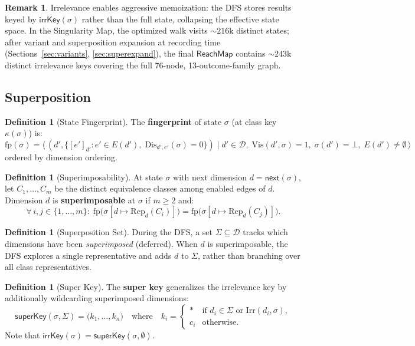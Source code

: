 \documentclass[11pt]{article}
\theoremstyle{definition}
\newtheorem{definition}[theorem]{Definition}
\newtheorem{remark}[theorem]{Remark}
\newcommand{\Dim}{\mathcal{D}}         %
\newcommand{\Edg}[1]{E(#1)}            %
\newcommand{\sel}{\sigma}              %
\newcommand{\ik}{\mathsf{irrKey}}      %
\newcommand{\ck}{\kappa}               %
\newcommand{\Vis}{\mathrm{Vis}}        %
\newcommand{\Dis}{\mathrm{Dis}}        %
\newcommand{\Irr}{\mathrm{Irr}}        %
\newcommand{\fp}{\mathrm{fp}}          %
\newcommand{\Rep}{\mathrm{Rep}}        %
\newcommand{\wildcard}{*}
\begin{document}
\begin{remark}
Irrelevance enables aggressive memoization: the DFS stores results keyed
by $\ik(\sel)$ rather than the full state, collapsing the effective state
space. In the Singularity Map, the optimized walk visits
${\sim}216\text{k}$ distinct states; after variant and superposition
expansion at recording time (Sections~\ref{sec:variants},
\ref{sec:superexpand}), the final $\mathsf{ReachMap}$ contains
${\sim}243\text{k}$ distinct irrelevance keys covering the full 76-node,
13-outcome-family graph.
\end{remark}

\subsection{Superposition}\label{sec:superposition}

\begin{definition}[State Fingerprint]\label{def:fingerprint}
The \textbf{fingerprint} of state $\sel$ (at class key $\ck(\sel)$)
is:
\[
  \fp(\sel) = \bigl\langle\,
    (d', \{[e']_{d'} : e' \in \Edg{d'},\;\Dis_{d',e'}(\sel)=0\})
    \;\big|\;
    d' \in \Dim,\;\Vis(d',\sel)=1,\;\sel(d')=\bot,\;
    \Edg{d'} \neq \emptyset
  \,\bigr\rangle
\]
ordered by dimension ordering.
\end{definition}

\begin{definition}[Superimposability]\label{def:super}
At state $\sel$ with next dimension $d = \mathsf{next}(\sel)$, let
$C_1,\dots,C_m$ be the distinct equivalence classes among enabled edges
of $d$. Dimension $d$ is \textbf{superimposable} at $\sel$ if $m \geq 2$
and:
\[
  \forall\, i,j \in \{1,\dots,m\}:\;
  \fp\!\bigl(\sel[d \mapsto \Rep_d(C_i)]\bigr)
  = \fp\!\bigl(\sel[d \mapsto \Rep_d(C_j)]\bigr).
\]
\end{definition}

\begin{definition}[Superposition Set]\label{def:superset}
During the DFS, a set $\Sigma \subseteq \Dim$ tracks which dimensions
have been \emph{superimposed} (deferred). When $d$ is superimposable, the
DFS explores a single representative and adds $d$ to $\Sigma$,
rather than branching over all class representatives.
\end{definition}

\begin{definition}[Super Key]\label{def:superkey}
The \textbf{super key} generalizes the irrelevance key by additionally
wildcarding superimposed dimensions:
\[
  \mathsf{superKey}(\sel,\Sigma) = \bigl(k_1,\dots,k_n\bigr)
  \quad\text{where}\quad
  k_i =
  \begin{cases}
    \wildcard & \text{if } d_i \in \Sigma \text{ or }
                \Irr(d_i,\sel),\\
    c_i       & \text{otherwise}.
  \end{cases}
\]
Note that $\ik(\sel) = \mathsf{superKey}(\sel, \emptyset)$.
\end{definition}
\end{document}
